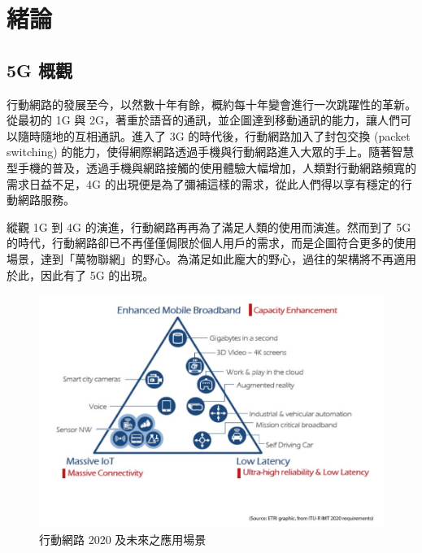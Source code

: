 \chapter{緒論}
\label{chapter:intro}


\section{5G 概觀}
\label{sec:5g_intro}

行動網路的發展至今，以然數十年有餘，概約每十年變會進行一次跳躍性的革新。從最初的 1G 與 2G，著重於語音的通訊，並企圖達到移動通訊的能力，讓人們可以隨時隨地的互相通訊。進入了 3G 的時代後，行動網路加入了封包交換 (packet switching) 的能力，使得網際網路透過手機與行動網路進入大眾的手上。隨著智慧型手機的普及，透過手機與網路接觸的使用體驗大幅增加，人類對行動網路頻寬的需求日益不足，4G 的出現便是為了彌補這樣的需求，從此人們得以享有穩定的行動網路服務。

縱觀 1G 到 4G 的演進，行動網路再再為了滿足人類的使用而演進。然而到了 5G 的時代，行動網路卻已不再僅僅侷限於個人用戶的需求，而是企圖符合更多的使用場景，達到「萬物聯網」的野心。為滿足如此龐大的野心，過往的架構將不再適用於此，因此有了 5G 的出現。

\begin{figure}[htbp]
    \centering
    \includegraphics[height=!,width=0.8\linewidth,keepaspectratio=true]{figures/usage_scenarios_of_IMT_for_2020}
    \caption[行動網路 2020 及未來之應用場景]{{\footnotesize 行動網路 2020 及未來之應用場景~\cite{IMT_2020}}}
    \label{fig:IMT_2020}
\end{figure}

